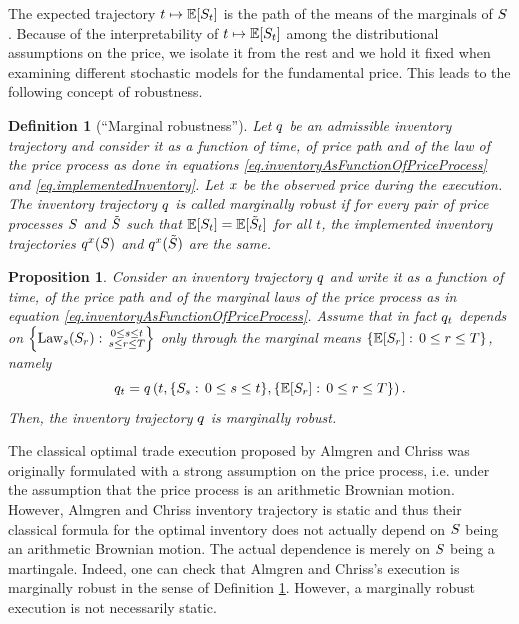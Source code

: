 \documentclass[10pt,a4paper]{article}
\newtheorem{defi}[thm]{Definition}
\newtheorem{prop}[thm]{Proposition}
\begin{document}
	The expected trajectory $t\mapsto \mathbb{{E}} [S_t]$ is the path of the means of the marginals of $S$. Because of the interpretability of $t\mapsto \mathbb{{E}} [S_t]$ among the distributional assumptions on the price, we isolate it from the rest and we hold it fixed when examining different stochastic models for the fundamental price. This leads to the following concept of robustness.
	\begin{defi}[``Marginal robustness'']\label{defi.marginalRobustness}
		Let $q$ be an admissible  inventory trajectory and consider it as a function of time, of price path and of the law of the price process as done in equations \eqref{eq.inventoryAsFunctionOfPriceProcess} and \eqref{eq.implementedInventory}. Let $x$ be the observed price during the execution. The inventory trajectory $q$ is called \emph{marginally robust} if for every pair of price processes $S$ and $\tilde{S}$ such that $\mathbb{{E}} [S_t] = \mathbb{{E}}[\tilde{S}_t]$ for all $t$, the implemented inventory trajectories $q^{x}(S)$ and $q^{x}(\tilde{S})$ are the same. 
	\end{defi}

	\begin{prop}\label{prop.sufficientConditionMarginalRobustness}
		Consider an inventory trajectory $q$ and write it as a function of time, of the price path and of the marginal laws of the price process as in equation \eqref{eq.inventoryAsFunctionOfPriceProcess}. Assume that in fact $q_t$ depends on $\left\lbrace \text{Law}_s (S_r): \, \substack{0\leq s \leq t \\s\leq r\leq T}\right \rbrace$ only through the marginal means $\lbrace \mathbb{{E}} [S_r]: \, 0\leq r\leq T \rbrace $, namely 
		\begin{equation}\label{eq.sufficientConditionMarginalRobustness}
		q_t = q \left(
		t, \lbrace S_s: \, 0\leq s \leq t\rbrace, \lbrace \mathbb{{E}} [S_r]: \, 0\leq r\leq T \rbrace
		\right). 
		\end{equation}
		Then, the inventory trajectory $q$ is marginally robust. 
	\end{prop}

	The classical optimal trade  execution proposed by Almgren and Chriss \cite{AC00opt} was originally formulated with a strong assumption on the price process, i.e. under the assumption that the price process is an arithmetic Brownian motion. However, Almgren and Chriss inventory trajectory is static and thus their classical formula for the optimal inventory does not actually depend on $S$ being an arithmetic Brownian motion. The actual dependence is merely on $S$ being a martingale. Indeed, one can check that Almgren and Chriss's execution is marginally robust in the sense of Definition \ref{defi.marginalRobustness}. However, a marginally robust execution is not necessarily static. 
	
\end{document}
